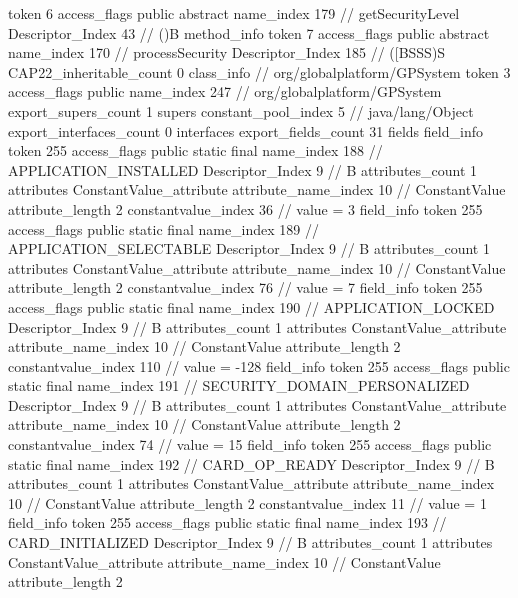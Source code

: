 {{{{{					token	6
					access_flags	public abstract
					name_index	179		// getSecurityLevel
					Descriptor_Index	43		// ()B
				}
				method_info {
					token	7
					access_flags	public abstract
					name_index	170		// processSecurity
					Descriptor_Index	185		// ([BSSS)S
				}
			}
			CAP22_inheritable_count	0
		}
		class_info {		// org/globalplatform/GPSystem
			token	3
			access_flags	public
			name_index	247		// org/globalplatform/GPSystem
			export_supers_count	1
			supers {
				constant_pool_index	5		// java/lang/Object
			}
			export_interfaces_count	0
			interfaces {
			}
			export_fields_count	31
			fields {
			field_info {
				token	255
				access_flags	public static final
				name_index	188		// APPLICATION_INSTALLED
				Descriptor_Index	9		// B
				attributes_count	1
				attributes {
				ConstantValue_attribute {
					attribute_name_index	10		// ConstantValue
					attribute_length	2
					constantvalue_index	36		// value = 3
				}
				}
			}
			field_info {
				token	255
				access_flags	public static final
				name_index	189		// APPLICATION_SELECTABLE
				Descriptor_Index	9		// B
				attributes_count	1
				attributes {
				ConstantValue_attribute {
					attribute_name_index	10		// ConstantValue
					attribute_length	2
					constantvalue_index	76		// value = 7
				}
				}
			}
			field_info {
				token	255
				access_flags	public static final
				name_index	190		// APPLICATION_LOCKED
				Descriptor_Index	9		// B
				attributes_count	1
				attributes {
				ConstantValue_attribute {
					attribute_name_index	10		// ConstantValue
					attribute_length	2
					constantvalue_index	110		// value = -128
				}
				}
			}
			field_info {
				token	255
				access_flags	public static final
				name_index	191		// SECURITY_DOMAIN_PERSONALIZED
				Descriptor_Index	9		// B
				attributes_count	1
				attributes {
				ConstantValue_attribute {
					attribute_name_index	10		// ConstantValue
					attribute_length	2
					constantvalue_index	74		// value = 15
				}
				}
			}
			field_info {
				token	255
				access_flags	public static final
				name_index	192		// CARD_OP_READY
				Descriptor_Index	9		// B
				attributes_count	1
				attributes {
				ConstantValue_attribute {
					attribute_name_index	10		// ConstantValue
					attribute_length	2
					constantvalue_index	11		// value = 1
				}
				}
			}
			field_info {
				token	255
				access_flags	public static final
				name_index	193		// CARD_INITIALIZED
				Descriptor_Index	9		// B
				attributes_count	1
				attributes {
				ConstantValue_attribute {
					attribute_name_index	10		// ConstantValue
					attribute_length	2
}}}}}}}
